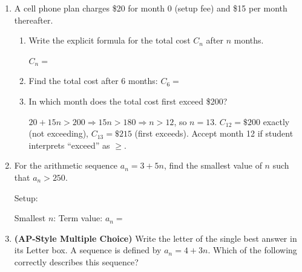 \documentclass[10pt]{article}
\begin{document}
\begin{enumerate}[itemsep=16pt]
\begin{enumerate}[label=(\alph*), itemsep=8pt]
              $a_0 = $ \smash{\gradedblank[id=hw2c1, type=short, points=1, answer={1}]{2.5cm}{13pt}} \quad $a_{10} = $ \smash{\gradedblank[id=hw2c2, type=short, points=1, answer={31}]{2.5cm}{13pt}}
      \end{enumerate}

\item A cell phone plan charges \$20 for month 0 (setup fee) and \$15 per month thereafter.

      \begin{enumerate}[label=(\alph*), itemsep=8pt]
        \item Write the explicit formula for the total cost $C_n$ after $n$ months.

              $C_n = $ \smash{\gradedblank[id=hw3a, type=short, points=1, answer={20 + 15n}]{5cm}{13pt}}

        \item Find the total cost after 6 months: $C_6 = $ \smash{\gradedblank[id=hw3b, type=short, points=1, answer={110}, display={\$110}]{3cm}{13pt}}

        \item In which month does the total cost first exceed \$200? \smash{\gradedblank[id=hw3c, type=short, points=2, answer={13}, display={Month 13}]{3cm}{13pt}}

      \begin{teachernote}
      $20 + 15n > 200 \Rightarrow 15n > 180 \Rightarrow n > 12$, so $n = 13$.
      $C_{12} = \$200$ exactly (not exceeding), $C_{13} = \$215$ (first exceeds).
      Accept month 12 if student interprets ``exceed'' as $\geq$.
      \end{teachernote}
      \end{enumerate}

\item For the arithmetic sequence $a_n = 3 + 5n$, find the smallest value of $n$ such that
      $a_n > 250$.

      \vspace{0.06in}
      Setup: \smash{\gradedblank[id=hw4a, type=short, check=text, points=1, answer={3 + 5n > 250}, display={$3 + 5n > 250$}]{6cm}{13pt}} \quad {}

      Smallest $n$: \smash{\gradedblank[id=hw4b, type=short, points=2, answer={50}]{2.5cm}{13pt}} \quad Term value: $a_n = $ \smash{\gradedblank[id=hw4c, type=short, points=1, answer={253}]{2.5cm}{13pt}}

\newpage
\item \textbf{(AP-Style Multiple Choice)} Write the letter of the single best answer in its Letter box. A sequence is defined by $a_n = 4 + 3n$.
      Which of the following correctly describes this sequence?


\end{enumerate}
\end{document}
